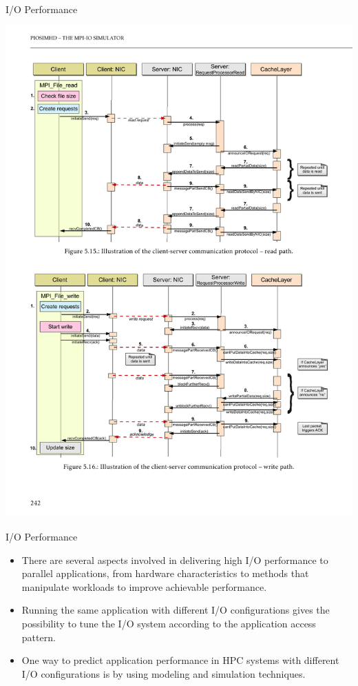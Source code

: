 \documentclass[compress,11pt,xcolor=svgnames,aspectratio=169]{beamer}
\begin{document}
\begin{frame}[t]{I/O Performance}

\begin{center}
\includegraphics[scale=0.4]{fig/io-path}
\end{center}

\nocite{SOPPOAASLK13}

\end{frame}

\begin{frame}[t]{I/O Performance}

\begin{itemize}
\setlength\itemsep{0.6cm}

  \item There are several aspects involved in delivering high I/O performance to parallel applications, from hardware characteristics to methods that manipulate workloads to improve achievable performance.

  \item Running the same application with different I/O configurations gives the possibility to tune the I/O system according to the application access pattern.

  \item One way to predict application performance in HPC systems with different I/O configurations is by using modeling and simulation techniques.

\end{itemize}

\nocite{SOPPOAASLK13}

\end{frame}
\end{document}
